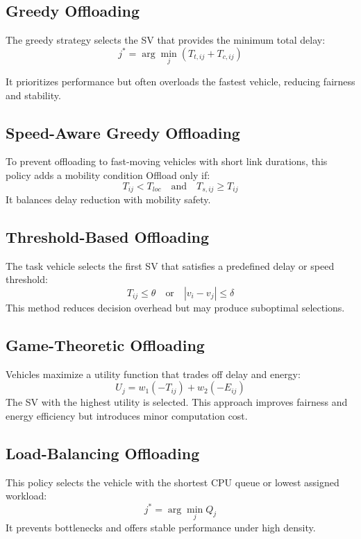 \documentclass[conference]{IEEEtran}
\begin{document}
\subsection{Greedy Offloading}
The greedy strategy selects the SV that provides the minimum total delay:
\begin{equation}
    j^* = \arg\min_{j} \left( T_{t,ij} + T_{c,ij} \right)
\end{equation}

It prioritizes performance but often overloads the fastest vehicle, reducing fairness and stability.

\subsection{Speed-Aware Greedy Offloading}
To prevent offloading to fast-moving vehicles with short link durations, this policy adds a mobility condition
Offload only if:
\begin{equation}
    T_{ij} < T_{loc} \quad \text{and} \quad T_{s,ij} \ge T_{ij}
\end{equation}
It balances delay reduction with mobility safety.

\subsection{Threshold-Based Offloading}
The task vehicle selects the first SV that satisfies a predefined delay or speed threshold:
\begin{equation}
    T_{ij} \le \theta \quad \text{or} \quad |v_i - v_j| \le \delta
\end{equation}
This method reduces decision overhead but may produce suboptimal selections.

\subsection{Game-Theoretic Offloading}
Vehicles maximize a utility function that trades off delay and energy:
\begin{equation}
    U_j = w_1 \left(-T_{ij}\right) + w_2 \left(-E_{ij}\right)
\end{equation}
The SV with the highest utility is selected.
This approach improves fairness and energy efficiency but introduces minor computation cost.

\subsection{Load-Balancing Offloading}
This policy selects the vehicle with the shortest CPU queue or lowest assigned workload:
\begin{equation}
    j^* = \arg\min_j Q_j
\end{equation}
It prevents bottlenecks and offers stable performance under high density.
\end{document}
